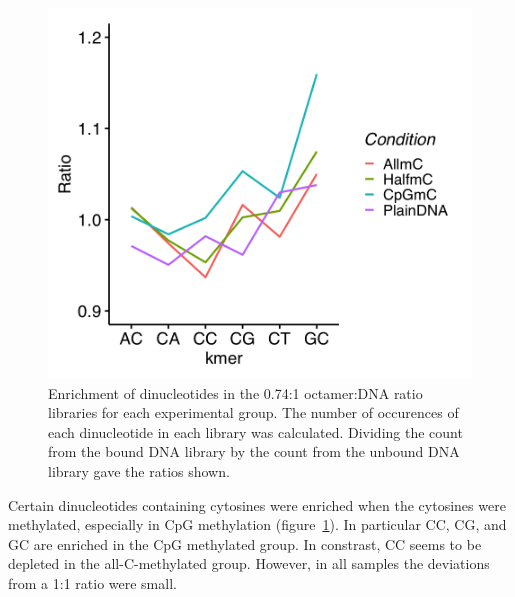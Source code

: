 \documentclass[parskip=full, numbers=noenddot]{scrreprt}
\begin{document}
\begin{figure}[htpb]
  \centering
  \includegraphics[width=\textwidth]{c2nt}
  \caption{Enrichment of dinucleotides in the 0.74:1 octamer:DNA ratio libraries for each experimental group.  The number of occurences of each dinucleotide in each library was calculated.  Dividing the count from the bound DNA library by the count from the unbound DNA library gave the ratios shown.} 
  \label{fig:c2nt}
\end{figure}

Certain dinucleotides containing cytosines were enriched when the cytosines were methylated, especially in CpG methylation (figure~\ref{fig:c2nt}).  In particular CC, CG, and GC are enriched in the CpG methylated group.  In constrast, CC seems to be depleted in the all-C-methylated group.  However, in all samples the deviations from a 1:1 ratio were small.
\end{document}
